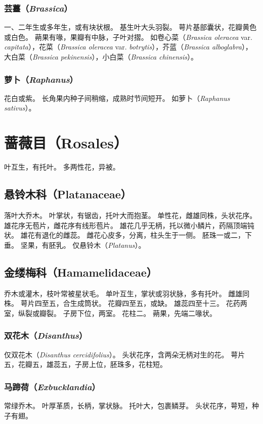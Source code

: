 \documentclass[11pt]{article}
\begin{document}
\begin{sloppypar}
\subsubsection{芸薹（\textit{Brassica}）}
一、二年生或多年生，或有块状根。
基生叶大头羽裂。
萼片基部囊状，花瓣黄色或白色。
蒴果有喙，果瓣有中脉，子叶对摺。
如卷心菜（\textit{Brassica oleracea} var. \textit{capitata}），花菜（\textit{Brassica oleracea} var. \textit{botrytis}），芥蓝（\textit{Brassica alboglabra}），大白菜（\textit{Brassica pekinensis}），小白菜（\textit{Brassica chinensis}）。

\subsubsection{萝卜（\textit{Raphanus}）}
花白或紫。
长角果内种子间稍缩，成熟时节间短开。
如萝卜（\textit{Raphanus sativus}）。

\section{蔷薇目（Rosales）}
叶互生，有托叶。
多两性花，异被。

\subsection{悬铃木科（Platanaceae）}
落叶大乔木。
叶掌状，有锯齿，托叶大而抱茎。
单性花，雌雄同株，头状花序。
雄花序无苞片，雌花序有线形苞片。
雄花几乎无柄，托以微小鳞片，药隔顶端钝状。
雄花有退化的雌蕊。
雌花心皮多，分离，柱头生于一侧。
胚珠一或二，下垂。
坚果，有胚乳。
仅悬铃木（\textit{Platanus}）。

\subsection{金缕梅科（Hamamelidaceae）}
乔木或灌木，枝叶常被星状毛。
单叶互生，掌状或羽状脉，多有托叶。
雌雄同株。
萼片四至五，合生成筒状。
花瓣四至五，或缺。
雄蕊四至十三。
花药两室，纵裂或瓣裂。
子房下位，两室。
花柱二。
蒴果，先端二喙状。

\subsubsection{双花木（\textit{Disanthus}）}
仅双花木（\textit{Disanthus cercidifolius}）。
头状花序，含两朵无柄对生的花。
萼片五，花瓣五，雄蕊五，子房上位，胚珠多，花柱短。

\subsubsection{马蹄荷（\textit{Exbucklandia}）}
常绿乔木。
叶厚革质，长柄，掌状脉。
托叶大，包裹鳞芽。
头状花序，萼短，种子有翅。


\end{sloppypar}
\end{document}
